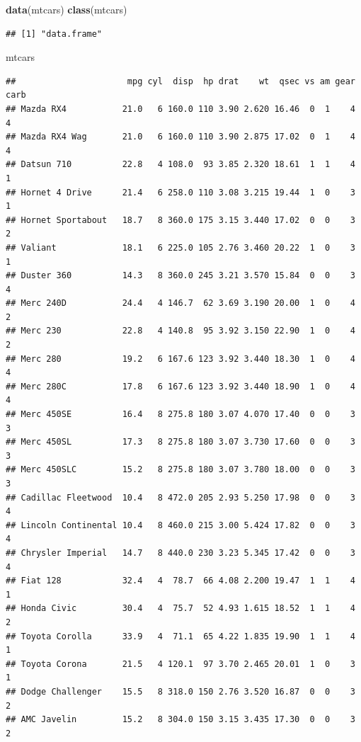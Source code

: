 \documentclass[]{report}
\newenvironment{Shaded}{\begin{snugshade}}{\end{snugshade}}
\newcommand{\KeywordTok}[1]{\textcolor[rgb]{0.13,0.29,0.53}{\textbf{#1}}}
\newcommand{\NormalTok}[1]{#1}
\begin{document}
\begin{Shaded}
\begin{Highlighting}[]
\KeywordTok{data}\NormalTok{(mtcars)}
\KeywordTok{class}\NormalTok{(mtcars)}
\end{Highlighting}
\end{Shaded}

\begin{verbatim}
## [1] "data.frame"
\end{verbatim}

\begin{Shaded}
\begin{Highlighting}[]
\NormalTok{mtcars}
\end{Highlighting}
\end{Shaded}

\begin{verbatim}
##                      mpg cyl  disp  hp drat    wt  qsec vs am gear carb
## Mazda RX4           21.0   6 160.0 110 3.90 2.620 16.46  0  1    4    4
## Mazda RX4 Wag       21.0   6 160.0 110 3.90 2.875 17.02  0  1    4    4
## Datsun 710          22.8   4 108.0  93 3.85 2.320 18.61  1  1    4    1
## Hornet 4 Drive      21.4   6 258.0 110 3.08 3.215 19.44  1  0    3    1
## Hornet Sportabout   18.7   8 360.0 175 3.15 3.440 17.02  0  0    3    2
## Valiant             18.1   6 225.0 105 2.76 3.460 20.22  1  0    3    1
## Duster 360          14.3   8 360.0 245 3.21 3.570 15.84  0  0    3    4
## Merc 240D           24.4   4 146.7  62 3.69 3.190 20.00  1  0    4    2
## Merc 230            22.8   4 140.8  95 3.92 3.150 22.90  1  0    4    2
## Merc 280            19.2   6 167.6 123 3.92 3.440 18.30  1  0    4    4
## Merc 280C           17.8   6 167.6 123 3.92 3.440 18.90  1  0    4    4
## Merc 450SE          16.4   8 275.8 180 3.07 4.070 17.40  0  0    3    3
## Merc 450SL          17.3   8 275.8 180 3.07 3.730 17.60  0  0    3    3
## Merc 450SLC         15.2   8 275.8 180 3.07 3.780 18.00  0  0    3    3
## Cadillac Fleetwood  10.4   8 472.0 205 2.93 5.250 17.98  0  0    3    4
## Lincoln Continental 10.4   8 460.0 215 3.00 5.424 17.82  0  0    3    4
## Chrysler Imperial   14.7   8 440.0 230 3.23 5.345 17.42  0  0    3    4
## Fiat 128            32.4   4  78.7  66 4.08 2.200 19.47  1  1    4    1
## Honda Civic         30.4   4  75.7  52 4.93 1.615 18.52  1  1    4    2
## Toyota Corolla      33.9   4  71.1  65 4.22 1.835 19.90  1  1    4    1
## Toyota Corona       21.5   4 120.1  97 3.70 2.465 20.01  1  0    3    1
## Dodge Challenger    15.5   8 318.0 150 2.76 3.520 16.87  0  0    3    2
## AMC Javelin         15.2   8 304.0 150 3.15 3.435 17.30  0  0    3    2

\end{verbatim}
\end{document}
